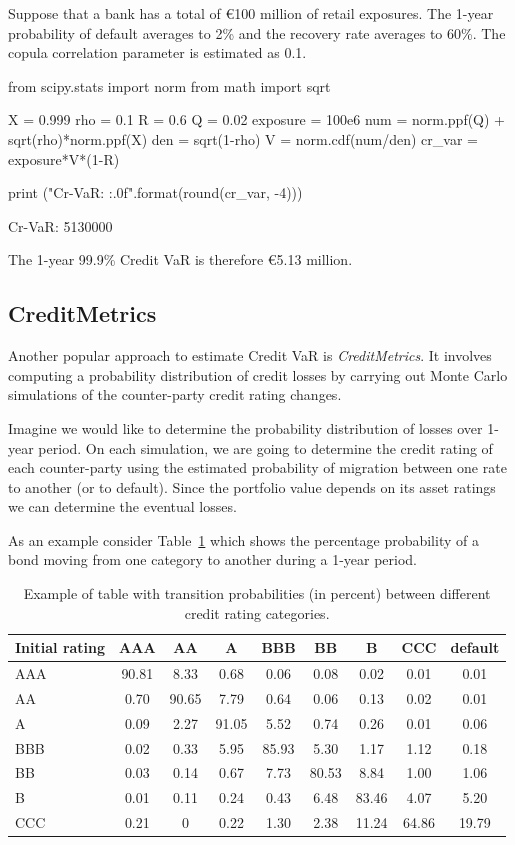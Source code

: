 Suppose that a bank has a total of \euro{100} million of retail exposures. The 1-year probability of default averages to 2\% and the recovery rate averages to 60\%. The copula correlation parameter is estimated as 0.1.

\begin{ipython}
from scipy.stats import norm
from math import sqrt

X = 0.999
rho = 0.1
R = 0.6
Q = 0.02
exposure = 100e6
num = norm.ppf(Q) + sqrt(rho)*norm.ppf(X)
den = sqrt(1-rho)
V = norm.cdf(num/den)
cr_var = exposure*V*(1-R)

print ("Cr-VaR: {:.0f}".format(round(cr_var, -4)))
\end{ipython}
\begin{ioutput}
Cr-VaR: 5130000
\end{ioutput}
\noindent
The 1-year 99.9\% Credit VaR is therefore \euro{5.13} million.

\subsection{CreditMetrics}
Another popular approach to estimate Credit VaR is \emph{CreditMetrics}. It involves computing a probability distribution of credit losses by carrying out Monte Carlo simulations of the counter-party credit rating changes.

Imagine we would like to determine the probability distribution of losses over 1-year period. On each simulation, we are going to determine the credit rating of each counter-party using the estimated probability of migration between one rate to another (or to default). Since the portfolio value depends on its asset ratings we can determine the eventual losses. 

As an example consider Table~\ref{tab:credit_ratings} which shows the percentage probability of a bond moving from one category to another during a 1-year period.

\begin{table}[htb]
	\centering
	\begin{tabular}{|l|c|c|c|c|c|c|c|c|}
	\hline
	Initial rating & AAA & AA & A & BBB & BB & B & CCC & default \\
	\hline
	\hline
	AAA & 90.81 & 8.33 & 0.68 & 0.06 & 0.08 & 0.02 & 0.01& 0.01 \\ 
	\hline
	AA & 0.70 & 90.65 & 7.79 & 0.64 & 0.06 & 0.13 & 0.02 & 0.01 \\ 
	\hline
	A & 0.09 & 2.27 & 91.05 & 5.52 & 0.74 & 0.26 & 0.01 & 0.06 \\ 
	\hline
	BBB & 0.02 & 0.33 & 5.95 & 85.93 & 5.30 & 1.17 & 1.12 & 0.18 \\
	\hline
	BB & 0.03 & 0.14 & 0.67 & 7.73 & 80.53 & 8.84 & 1.00 & 1.06 \\
	\hline
	B & 0.01 & 0.11 & 0.24 & 0.43 & 6.48 & 83.46 & 4.07 & 5.20 \\
	\hline
	CCC & 0.21 & 0 & 0.22 & 1.30 & 2.38 & 11.24 & 64.86 & 19.79 \\		
	\hline
\end{tabular}
\caption{Example of table with transition probabilities (in percent) between different credit rating categories.}
\label{tab:credit_ratings}
\end{table}

